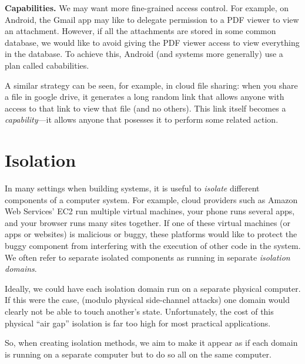 \documentclass[
  letterpaper,
]{scrbook}
\theoremstyle{definition}
\theoremstyle{plain}
\theoremstyle{plain}
\theoremstyle{remark}
\begin{document}
\textbf{Capabilities.} We may want more fine-grained access control. For
example, on Android, the Gmail app may like to delegate permission to a
PDF viewer to view an attachment. However, if all the attachments are
stored in some common database, we would like to avoid giving the PDF
viewer access to view everything in the database. To achieve this,
Android (and systems more generally) use a plan called cababilities.

A similar strategy can be seen, for example, in cloud file sharing: when
you share a file in google drive, it generates a long random link that
allows anyone with access to that link to view that file (and no
others). This link itself becomes a \emph{capability}---it allows anyone
that posesses it to perform some related action.

\chapter{Isolation}\label{isolation-1}

In many settings when building systems, it is useful to \emph{isolate}
different components of a computer system. For example, cloud providers
such as Amazon Web Services' EC2 run multiple virtual machines, your
phone runs several apps, and your browser runs many sites together. If
one of these virtual machines (or apps or websites) is malicious or
buggy, these platforms would like to protect the buggy component from
interfering with the execution of other code in the system. We often
refer to separate isolated components as running in separate
\emph{isolation domains}.

Ideally, we could have each isolation domain run on a separate physical
computer. If this were the case, (modulo physical side-channel attacks)
one domain would clearly not be able to touch another's state.
Unfortunately, the cost of this physical ``air gap'' isolation is far
too high for most practical applications.


So, when creating isolation methods, we aim to make it appear as if each
domain is running on a separate computer but to do so all on the same
computer.
\end{document}
